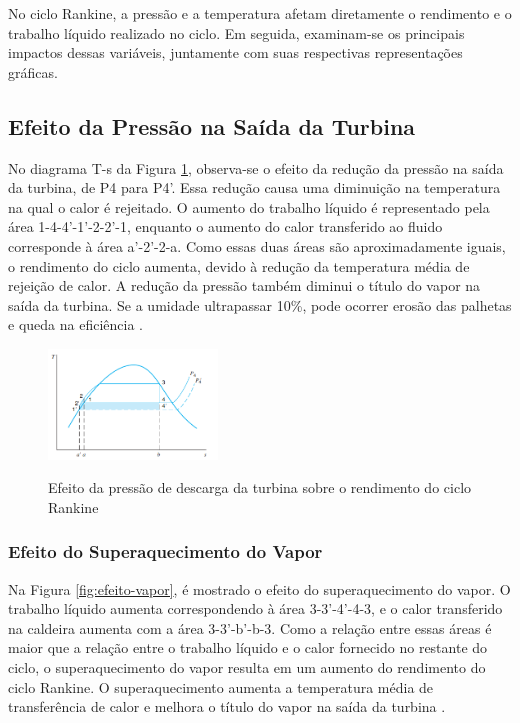 \documentclass[
	article,			%
	11pt,				%
	oneside,			%
	a4paper,			%
	english,			%
	brazil,				%
	sumario=tradicional
	]{abntex2}
\begin{document}
No ciclo Rankine, a pressão e a temperatura afetam diretamente o rendimento e o trabalho líquido realizado no ciclo. Em seguida, examinam-se os principais impactos dessas variáveis, juntamente com suas respectivas representações gráficas.

\subsection{Efeito da Pressão na Saída da Turbina}

No diagrama T-s da Figura \ref{fig:efeito-pressao}, observa-se o efeito da redução da pressão na saída da turbina, de P4 para P4'. Essa redução causa uma diminuição na temperatura na qual o calor é rejeitado. O aumento do trabalho líquido é representado pela área 1-4-4'-1'-2-2'-1, enquanto o aumento do calor transferido ao fluido corresponde à área a'-2'-2-a. Como essas duas áreas são aproximadamente iguais, o rendimento do ciclo aumenta, devido à redução da temperatura média de rejeição de calor. A redução da pressão também diminui o título do vapor na saída da turbina. Se a umidade ultrapassar 10\%, pode ocorrer erosão das palhetas e queda na eficiência \cite{borgnakke-2020}.

\begin{figure}[h]
	\centering
	\includegraphics[width=0.4\textwidth]{./images/efeito-pressao.png}
	\label{fig:efeito-pressao}
	\caption{Efeito da pressão de descarga da turbina sobre o rendimento do ciclo Rankine}
\end{figure}

\subsubsection{Efeito do Superaquecimento do Vapor}

Na Figura \ref{fig:efeito-vapor}, é mostrado o efeito do superaquecimento do vapor. O trabalho líquido aumenta correspondendo à área 3-3'-4'-4-3, e o calor transferido na caldeira aumenta com a área 3-3'-b'-b-3. Como a relação entre essas áreas é maior que a relação entre o trabalho líquido e o calor fornecido no restante do ciclo, o superaquecimento do vapor resulta em um aumento do rendimento do ciclo Rankine. O superaquecimento aumenta a temperatura média de transferência de calor e melhora o título do vapor na saída da turbina \cite{borgnakke-2020}.
\end{document}
